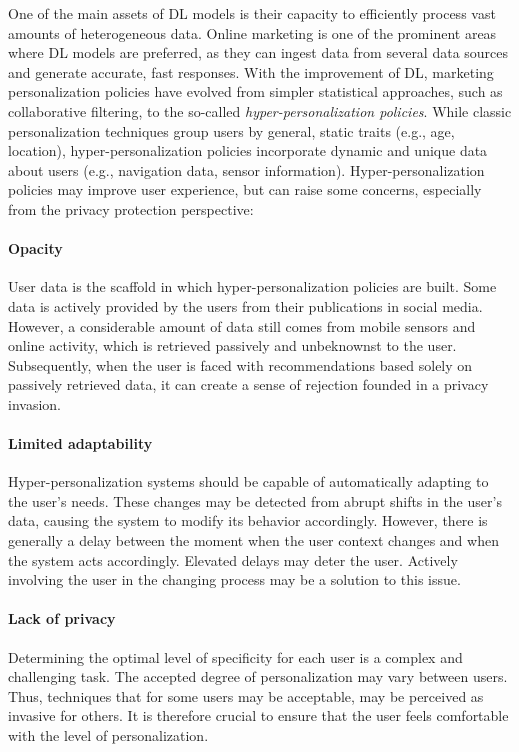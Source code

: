 One of the main assets of DL models is their capacity to efficiently process vast amounts of heterogeneous data. Online marketing is one of the prominent areas where DL models are preferred, as they can ingest data from several data sources and generate accurate, fast responses. With the improvement of DL, marketing personalization policies have evolved from simpler statistical approaches, such as collaborative filtering, to the so-called \textit{hyper-personalization policies}. While classic personalization techniques group users by general, static traits (e.g., age, location), hyper-personalization policies incorporate dynamic and unique data about users (e.g., navigation data, sensor information). Hyper-personalization policies may improve user experience, but can raise some concerns, especially from the privacy protection perspective:

\paragraph{Opacity}
User data is the scaffold in which hyper-personalization policies are built. Some data is actively provided by the users from their publications in social media. However, a considerable amount of data still comes from mobile sensors and online activity, which is retrieved passively and unbeknownst to the user. Subsequently, when the user is faced with recommendations based solely on passively retrieved data, it can create a sense of rejection founded in a privacy invasion.

\paragraph{Limited adaptability} 
Hyper-personalization systems should be capable of automatically adapting to the user's needs. These changes may be detected from abrupt shifts in the user's data, causing the system to modify its behavior accordingly. However, there is generally a delay between the moment when the user context changes and when the system acts accordingly. Elevated delays may deter the user. Actively involving the user in the changing process may be a solution to this issue.

\paragraph{Lack of privacy}
Determining the optimal level of specificity for each user is a complex and challenging task. The accepted degree of personalization may vary between users. Thus, techniques that for some users may be acceptable, may be perceived as invasive for others. It is therefore crucial to ensure that the user feels comfortable with the level of personalization.

